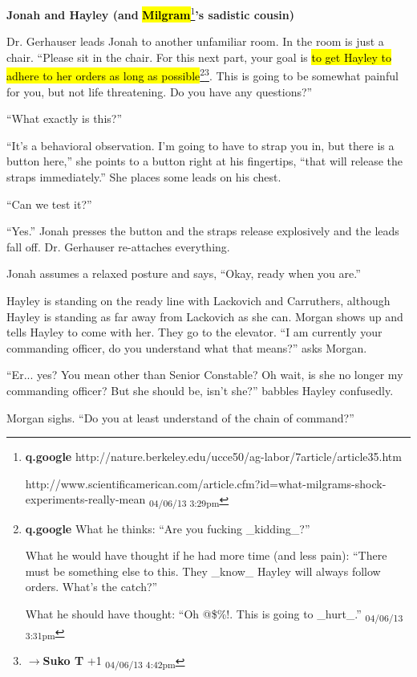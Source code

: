\textbf{Jonah and Hayley (and }\textbf{\hl{Milgram}}\footnote{\textbf{q.google }http://nature.berkeley.edu/ucce50/ag-labor/7article/article35.htm

http://www.scientificamerican.com/article.cfm?id=what-milgrams-shock-experiments-really-mean \textsubscript{04/06/13 3:29pm}}\textbf{'s sadistic cousin)}



Dr. Gerhauser leads Jonah to another unfamiliar room.  In the room is just a chair.  ``Please sit in the chair.  For this next part, your goal is \hl{to get Hayley to adhere to her orders as long as possible}\footnote{\textbf{q.google }What he thinks: ``Are you fucking \_kidding\_?''

What he would have thought if he had more time (and less pain): ``There must be something else to this.  They \_know\_ Hayley will always follow orders.  What's the catch?''

What he should have thought: ``Oh @\$\%!.  This is going to \_hurt\_.'' \textsubscript{04/06/13 3:31pm}}\footnote{$\rightarrow$\textbf{Suko T }+1 \textsubscript{04/06/13 4:42pm}}.  This is going to be somewhat painful for you, but not life threatening.  Do you have any questions?'' 

``What exactly is this?''

``It's a behavioral observation.  I'm going to have to strap you in, but there is a button here,'' she points to a button right at his fingertips, ``that will release the straps immediately.''  She places some leads on his chest.

``Can we test it?''

``Yes.''  Jonah presses the button and the straps release explosively and the leads fall off.  Dr. Gerhauser re-attaches everything.

Jonah assumes a relaxed posture and says, ``Okay, ready when you are.''



Hayley is standing on the ready line with Lackovich and Carruthers, although Hayley is standing as far away from Lackovich as she can.  Morgan shows up and tells Hayley to come with her. They go to the elevator.  ``I am currently your commanding officer, do you understand what that means?'' asks Morgan.

``Er... yes?  You mean other than Senior Constable?  Oh wait, is she no longer my commanding officer?  But she should be, isn't she?'' babbles Hayley confusedly.

Morgan sighs.  ``Do you at least understand of the chain of command?''

